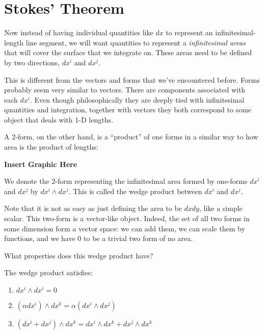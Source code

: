 	
	
	
	
	\section{Stokes' Theorem} %
	\label{sec:stokes_theorem}
	

	Now instead of having individual quantities like $dx$ to represent an infinitesimal-length line segment, we will want quantities to represent a \emph{infinitesimal areas} that will cover the surface that we integrate on. These areas need to be defined by two directions, $dx^i$ and $dx^j$. 
	
	This is different from the vectors and forms that we've encountered before. Forms probably seem very similar to vectors. There are components associated with each $dx^i$. Even though philosophically they are deeply tied with infinitesimal quantities and integration, together with vectors they both correspond to some object that deals with 1-D lengths. 
	
	A 2-form, on the other hand, is a ``product'' of one forms in a similar way to how area is the product of lengths:
	
	\textbf{Insert Graphic Here}
	
	We denote the 2-form representing the infinitesimal area formed by one-forms $dx^i$ and $dx^j$ by $dx^i \wedge dx^j$. This is called the wedge product between $dx^i$ and $dx^j$.
	

	Note that it is not as easy as just defining the area to be $dx dy$, like a simple scalar. This two-form is a vector-like object. Indeed, the set of all two forms in some dimension form a vector space: we can add them, we can scale them by functions, and we have $0$ to be a trivial two form of no area. 
	
	What properties does this wedge product have? 
	
	\begin{prop}
		The wedge product satisfies:
		\begin{enumerate}
			\item $dx^i \wedge dx^i = 0$
			\item $(\alpha dx^i) \wedge dx^k = \alpha (dx^i \wedge dx^j)$
			\item $(dx^i + dx^j) \wedge dx^k = dx^i \wedge dx^k + dx^j \wedge dx^k$
		\end{enumerate}
	\end{prop}
	
